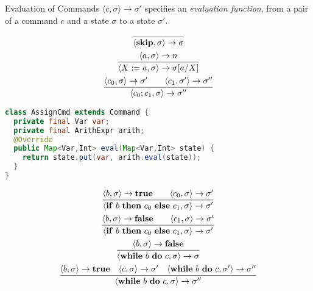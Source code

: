 \begin{frame}[fragile]{Evaluation of Commands}
    $\langle c, \sigma \rangle \rightarrow \sigma'$ specifies an \emph{evaluation function}, from
    a pair of a command $c$ and a state $\sigma$ to a state $\sigma'$.\\
    \begin{overprint}
        \begin{gather*}
            \infer{\langle \mathbf{skip}, \sigma \rangle \rightarrow \sigma}{} \\
            \infer{\langle X := a , \sigma \rangle \rightarrow \sigma[a/X]}{\langle a , \sigma \rangle \rightarrow n} \\
            \infer{\langle c_0; c_1 , \sigma \rangle \rightarrow \sigma''}{\langle c_0 , \sigma \rangle \rightarrow  \sigma' \qquad \langle c_1 , \sigma' \rangle \rightarrow \sigma''}
        \end{gather*}
        \begin{lstlisting}[language=java, basicstyle=\small]
class AssignCmd extends Command {
  private final Var var;
  private final ArithExpr arith;
  @Override
  public Map<Var,Int> eval(Map<Var,Int> state) {
    return state.put(var, arith.eval(state));
  }
}
        \end{lstlisting}
        \begin{gather*}
            \infer{\langle \mathbf{if}\ b\ \mathbf{then}\ c_0\ \mathbf{else}\ c_1, \sigma \rangle \rightarrow \sigma'}{\langle b , \sigma \rangle \rightarrow  \mathbf{true} \qquad \langle c_0 , \sigma \rangle \rightarrow \sigma'} \\
            \infer{\langle \mathbf{if}\ b\ \mathbf{then}\ c_0\ \mathbf{else}\ c_1, \sigma \rangle \rightarrow \sigma'}{\langle b , \sigma \rangle \rightarrow  \mathbf{false} \qquad \langle c_1 , \sigma \rangle \rightarrow \sigma'} \\
            \infer{\langle \mathbf{while}\ b\ \mathbf{do}\ c, \sigma \rangle \rightarrow \sigma}{\langle b , \sigma \rangle \rightarrow  \mathbf{false} } \\
            \infer{\langle \mathbf{while}\ b\ \mathbf{do}\ c, \sigma \rangle \rightarrow \sigma''}{\langle b , \sigma \rangle \rightarrow  \mathbf{true} \quad \langle c , \sigma \rangle \rightarrow \sigma' \quad \langle \mathbf{while}\ b\ \mathbf{do}\ c, \sigma' \rangle \rightarrow \sigma''}
        \end{gather*}
    \end{overprint}
\end{frame}

